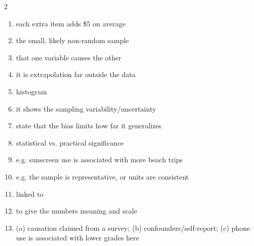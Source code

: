 \documentclass[11pt]{article}
\begin{document}
\begin{keybox}
\begin{multicols}{2}
\small
\begin{enumerate}[leftmargin=*,itemsep=3pt]
  \item each extra item adds \$5 on average
  \item the small, likely non-random sample
  \item that one variable causes the other
  \item it is extrapolation far outside the data
  \item histogram
  \item it shows the sampling variability/uncertainty
  \item state that the bias limits how far it generalizes
  \item statistical vs. practical significance
  \item e.g. sunscreen use is associated with more beach trips
  \item e.g. the sample is representative, or units are consistent
  \item linked to
  \item to give the numbers meaning and scale
  \item (a) causation claimed from a survey; (b) confounders/self-report; (c) phone use is associated with lower grades here
\end{enumerate}
\end{multicols}
\end{keybox}
\end{document}
